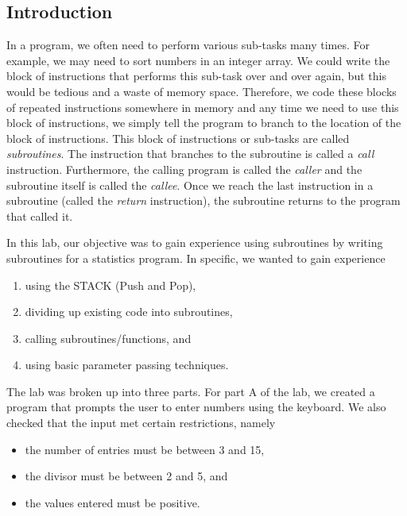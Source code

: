 \documentclass[10pt, letterpaper, titlepage]{article} %
\title{\textbf{\Huge{
\begin{center}
Introduction to\\ Subroutines \\
\end{center}
}}}
\author{Benjamin Kong | 1573684\\Lora Ma ||||| 1570935\\ \\ECE 212 Lab Section H11}
\begin{document}
 
\maketitle 
\thispagestyle{empty}
\tableofcontents 
\newpage
{}

\begin{multicols*}{2}


\section{Introduction}
In a program, we often need to perform various sub-tasks many times. For example, we may need to sort numbers in an integer array. We could write the block of instructions that performs this sub-task over and over again, but this would be tedious and a waste of memory space. Therefore, we code these blocks of repeated instructions somewhere in memory and any time we need to use this block of instructions, we simply tell the program to branch to the location of the block of instructions. This block of instructions or sub-tasks are called \textit{subroutines}. The instruction that branches to the subroutine is called a \textit{call} instruction. Furthermore, the calling program is called the \textit{caller} and the subroutine itself is called the \textit{callee}. Once we reach the last instruction in a subroutine (called the \textit{return} instruction), the subroutine returns to the program that called it. 

In this lab, our objective was to gain experience using subroutines by writing subroutines for a statistics program. In specific, we wanted to gain experience
\begin{enumerate}
\item using the STACK (Push and Pop),
\item dividing up existing code into subroutines,
\item calling subroutines/functions, and
\item using basic parameter passing techniques.
\end{enumerate}
The lab was broken up into three parts. For part A of the lab, we created a program that prompts the user to enter numbers using the keyboard. We also checked that the input met certain restrictions, namely
\begin{itemize}
\item the number of entries must be between 3 and 15,
\item the divisor must be between 2 and 5, and
\item the values entered must be positive.
\end{itemize}


\end{multicols*}
\end{document}
